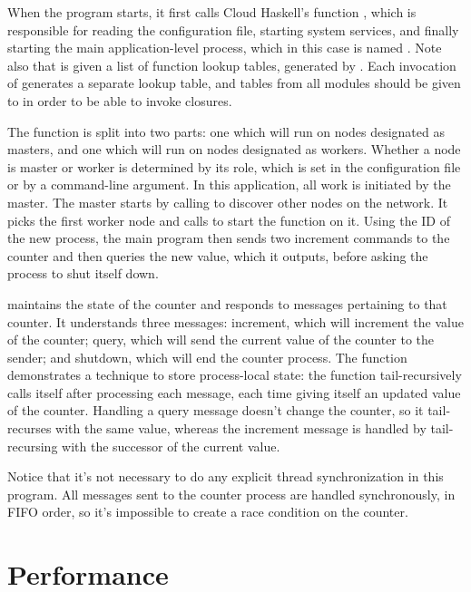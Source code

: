 \documentclass[preprint]{sigplanconf}
\begin{document}
When the program starts, it first calls Cloud Haskell's function , which is responsible for reading the configuration file, starting system services, and finally starting the main application-level process, which in this case is named . Note also that  is given a list of function lookup tables, generated by . Each invocation of  generates a separate lookup table, and tables from all modules should be given to  in order to be able to invoke closures.

The  function is split into two parts: one which will run on nodes designated as masters, and one which will run on nodes designated as workers. Whether a node is master or worker is determined by its role, which is set in the configuration file or by a command-line argument. In this application, all work is initiated by the master. The master starts by calling  to discover other nodes on the network. It picks the first worker node and calls  to start the  function on it. Using the ID of the new process, the main program then sends two increment commands to the counter and then queries the new value, which it outputs, before asking the process to shut itself down.

 maintains the state of the counter and responds to messages pertaining to that counter. It understands three messages: increment, which will increment the value of the counter; query, which will send the current value of the counter to the sender; and shutdown, which will end the counter process. The  function demonstrates a technique to store process-local state: the function tail-recursively calls itself after processing each message, each time giving itself an updated value of the counter. Handling a query message doesn't change the counter, so it tail-recurses with the same value, whereas the increment message is handled by tail-recursing with the successor of the current value.

Notice that it's not necessary to do any explicit thread synchronization in this program. All messages sent to the counter process are handled synchronously, in FIFO order, so it's impossible to create a race condition on the counter.

\section{Performance}
\end{document}
